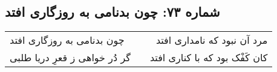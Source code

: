 \begin{center}
\section*{شماره ۷۳: چون بدنامی به روزگاری افتد}
\label{sec:073}
\begin{longtable}{l p{0.5cm} r}
چون بدنامی به روزگاری افتد
&&
مرد آن نبود که نامداری افتد
\\
گر دُر خواهی ز قعرِ دریا طلبی
&&
کان کَفْک بود که با کناری افتد
\\
\end{longtable}
\end{center}
